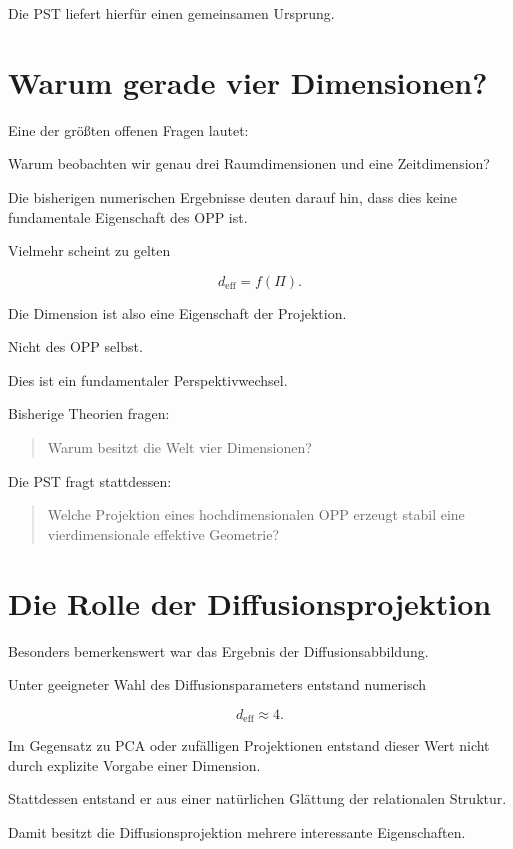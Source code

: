 Die PST liefert hierfür einen gemeinsamen Ursprung.

\section*{Warum gerade vier Dimensionen?}

Eine der größten offenen Fragen lautet:

\begin{center}
Warum beobachten wir genau drei Raumdimensionen und eine Zeitdimension?
\end{center}

Die bisherigen numerischen Ergebnisse deuten darauf hin, dass dies keine fundamentale Eigenschaft des OPP ist.

Vielmehr scheint zu gelten

\[
d_{\mathrm{eff}}
=
f(\Pi).
\]

Die Dimension ist also eine Eigenschaft der Projektion.

Nicht des OPP selbst.

Dies ist ein fundamentaler Perspektivwechsel.

Bisherige Theorien fragen:

\begin{quote}
Warum besitzt die Welt vier Dimensionen?
\end{quote}

Die PST fragt stattdessen:

\begin{quote}
Welche Projektion eines hochdimensionalen OPP erzeugt stabil eine vierdimensionale effektive Geometrie?
\end{quote}

\section*{Die Rolle der Diffusionsprojektion}

Besonders bemerkenswert war das Ergebnis der Diffusionsabbildung.

Unter geeigneter Wahl des Diffusionsparameters entstand numerisch

\[
d_{\mathrm{eff}}
\approx
4.
\]

Im Gegensatz zu PCA oder zufälligen Projektionen entstand dieser Wert nicht durch explizite Vorgabe einer Dimension.

Stattdessen entstand er aus einer natürlichen Glättung der relationalen Struktur.

Damit besitzt die Diffusionsprojektion mehrere interessante Eigenschaften.

